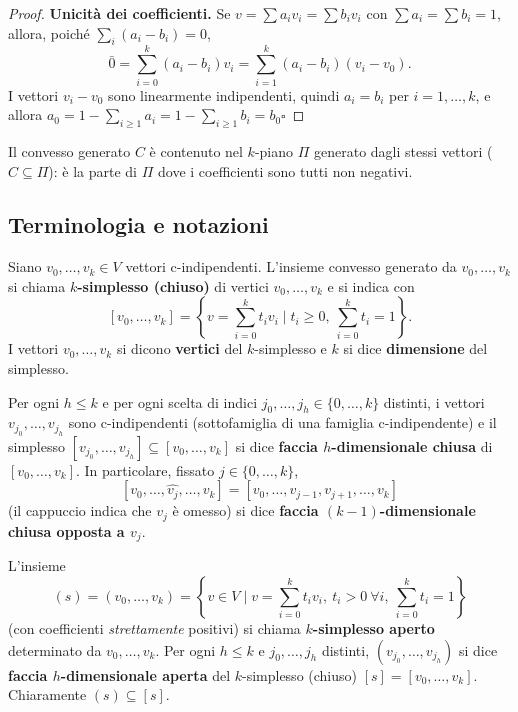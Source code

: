\begin{proof}
\textbf{Unicit\`a dei coefficienti.} Se $v = \sum a_i v_i = \sum b_i v_i$ con $\sum a_i = \sum b_i = 1$, allora, poich\'e $\sum_i (a_i - b_i) = 0$,
\[
\bar{0} = \sum_{i=0}^k (a_i - b_i) v_i = \sum_{i=1}^k (a_i - b_i)(v_i - v_0) .
\]
I vettori $v_i - v_0$ sono linearmente indipendenti, quindi $a_i = b_i$ per $i = 1, \dots, k$, e allora $a_0 = 1 - \sum_{i \geqslant 1} a_i = 1 - \sum_{i \geqslant 1} b_i = b_0$\hfill$\square$
\end{proof}

\begin{observacion}
Il convesso generato $C$ \`e contenuto nel $k$-piano $\Pi$ generato dagli stessi vettori ($C \subseteq \Pi$): \`e la parte di $\Pi$ dove i coefficienti sono tutti non negativi.
\end{observacion}


\subsection{Terminologia e notazioni}

Siano $v_0, \dots, v_k \in V$ vettori c-indipendenti. L'insieme convesso generato da $v_0, \dots, v_k$ si chiama \textbf{$k$-simplesso (chiuso)} di vertici $v_0, \dots, v_k$ e si indica con
\[
[v_0, \dots, v_k] = \left\{ v = \sum_{i=0}^k t_i v_i \;\Big|\; t_i \geqslant 0,\ \sum_{i=0}^k t_i = 1 \right\}.
\]
I vettori $v_0, \dots, v_k$ si dicono \textbf{vertici} del $k$-simplesso e $k$ si dice \textbf{dimensione} del simplesso.

\medskip
Per ogni $h \leqslant k$ e per ogni scelta di indici $j_0, \dots, j_h \in \{0, \dots, k\}$ distinti, i vettori $v_{j_0}, \dots, v_{j_h}$ sono c-indipendenti (sottofamiglia di una famiglia c-indipendente) e il simplesso $[v_{j_0}, \dots, v_{j_h}] \subseteq [v_0, \dots, v_k]$ si dice \textbf{faccia $h$-dimensionale chiusa} di $[v_0, \dots, v_k]$. In particolare, fissato $j \in \{0, \dots, k\}$,
\[
[v_0, \dots, \widehat{v_j}, \dots, v_k] = [v_0, \dots, v_{j-1}, v_{j+1}, \dots, v_k]
\]
(il cappuccio indica che $v_j$ \`e omesso) si dice \textbf{faccia $(k-1)$-dimensionale chiusa opposta a $v_j$}.

\medskip
L'insieme
\[
(s) = (v_0, \dots, v_k) = \left\{ v \in V \;\Big|\; v = \sum_{i=0}^k t_i v_i,\ t_i > 0\ \forall i,\ \sum_{i=0}^k t_i = 1 \right\}
\]
(con coefficienti \emph{strettamente} positivi) si chiama \textbf{$k$-simplesso aperto} determinato da $v_0, \dots, v_k$. Per ogni $h \leqslant k$ e $j_0, \dots, j_h$ distinti, $(v_{j_0}, \dots, v_{j_h})$ si dice \textbf{faccia $h$-dimensionale aperta} del $k$-simplesso (chiuso) $[s] = [v_0, \dots, v_k]$. Chiaramente $(s) \subseteq [s]$.

